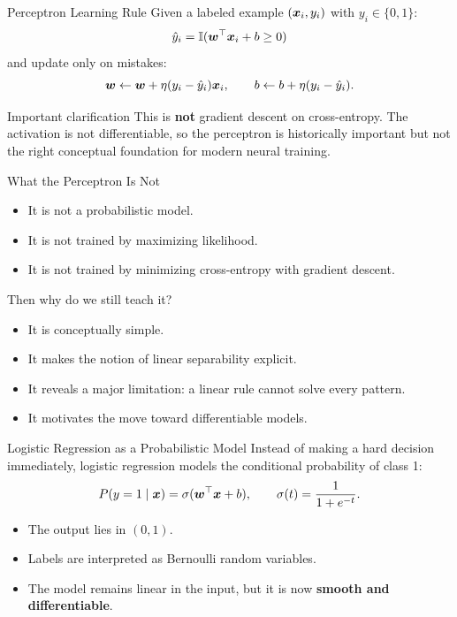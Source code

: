 \documentclass[11pt,aspectratio=169,professionalfonts]{beamer}
\begin{document}
%
%
\begin{frame}{Perceptron Learning Rule}
Given a labeled example $(\bm{x}_i,y_i)$ with $y_i \in \{0,1\}$:
\[
\hat{y}_i = \mathbb{I}(\bm{w}^{\top}\bm{x}_i + b \ge 0)
\]
and update only on mistakes:
\[
\bm{w} \leftarrow \bm{w} + \eta(y_i - \hat{y}_i)\bm{x}_i,
\qquad
b \leftarrow b + \eta(y_i - \hat{y}_i).
\]

\vspace{0.2cm}
\begin{block}{Important clarification}
This is \textbf{not} gradient descent on cross-entropy. The activation is not differentiable, so the perceptron is historically important but not the right conceptual foundation for modern neural training.
\end{block}
\end{frame}
%
%
\begin{frame}{What the Perceptron Is Not}
\begin{itemize}
    \item It is not a probabilistic model.
    \item It is not trained by maximizing likelihood.
    \item It is not trained by minimizing cross-entropy with gradient descent.
\end{itemize}

\vspace{0.25cm}
\begin{block}{Then why do we still teach it?}
\begin{itemize}
    \item It is conceptually simple.
    \item It makes the notion of linear separability explicit.
    \item It reveals a major limitation: a linear rule cannot solve every pattern.
    \item It motivates the move toward differentiable models.
\end{itemize}
\end{block}
\end{frame}
%
%
\begin{frame}{Logistic Regression as a Probabilistic Model}
Instead of making a hard decision immediately, logistic regression models the conditional probability of class 1:
\[
P(y=1\mid \bm{x}) = \sigma(\bm{w}^{\top}\bm{x}+b),
\qquad
\sigma(t)=\frac{1}{1+e^{-t}}.
\]

\vspace{0.2cm}
\begin{itemize}
    \item The output lies in $(0,1)$.
    \item Labels are interpreted as Bernoulli random variables.
    \item The model remains linear in the input, but it is now \textbf{smooth and differentiable}.
\end{itemize}
\end{frame}
\end{document}
